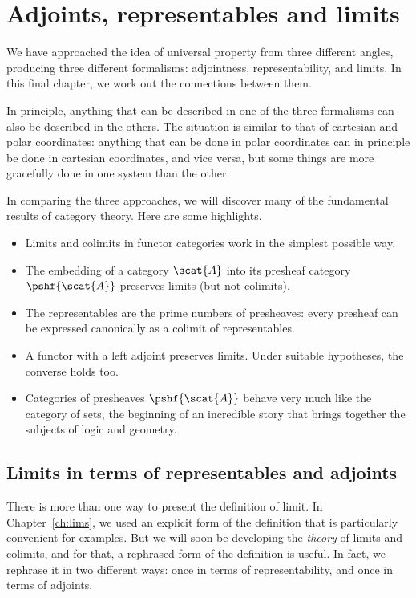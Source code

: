 \chapter{Adjoints, representables and limits}
\label{ch:arl}


We have approached the idea of universal property from three different
angles, producing three different formalisms: adjointness,
representability, and limits.  In this final chapter, we work out the
connections between them.

In principle, anything that can be described in one of the three formalisms
can also be described in the others.  The situation is similar to that of
cartesian and polar coordinates: anything that can be done in polar
coordinates can in principle be done in cartesian coordinates, and vice
versa, but some things are more gracefully done in one system than the
other.

In comparing the three approaches, we will discover many of the fundamental
results of category theory.  Here are some highlights.
% 
\begin{itemize}
\item 
Limits and colimits in functor categories work in the simplest possible
way.

\item 
The embedding of a category $\scat{A}$ into its presheaf category
$\pshf{\scat{A}}$ preserves limits (but not colimits).

\item 
The representables are the prime numbers of presheaves: every presheaf can
be expressed canonically as a colimit of representables.

\item 
A functor with a left adjoint preserves limits.  Under suitable hypotheses,
the converse holds too.

\item 
Categories of presheaves $\pshf{\scat{A}}$ behave very much like the
category of sets, the beginning of an incredible story that brings together
the subjects of logic and geometry.
\end{itemize}



\section{Limits in terms of representables and adjoints}
\label{sec:lra}


There is more than one way to present the definition of limit.  In
Chapter~\ref{ch:lims}, we used an explicit form of the definition that is
particularly convenient for examples.  But we will soon be developing the
\emph{theory} of limits and colimits, and for that, a rephrased form of the
definition is useful.  In fact, we rephrase it in two different ways: once
in terms of representability, and once in terms of adjoints.

